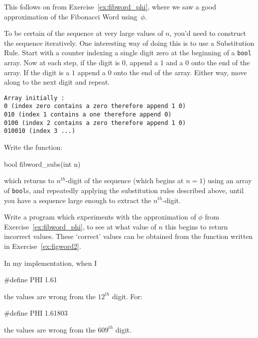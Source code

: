 \label{sec:fibword_subs}


This follows on from Exercise~\ref{ex:fibword_phi}, where we saw a
good approximation of the Fibonacci Word using~$\phi$.

To be certain of the sequence at very large values of $n$, you'd need to
construct the sequence iteratively. One interesting way of doing this
is to use a Substitution Rule. Start with a counter indexing a
single digit zero at the beginning of a \verb^bool^ array. Now at each step,
if the digit is $0$, append a $1$ and a $0$ onto the end of the array.
If the digit is a $1$ append a $0$ onto the end of the array.
Either way, move along to the next digit and repeat.
\begin{verbatim}
Array initially :
0 (index zero contains a zero therefore append 1 0)
010 (index 1 contains a one therefore append 0)
0100 (index 2 contains a zero therefore append 1 0)
010010 (index 3 ...)
\end{verbatim}


\begin{exercise}
\label{ex:fibword_subs}
Write the function:
\begin{codesnippet}
bool fibword_subs(int n)
\end{codesnippet}
which returns to $n^{th}$-digit of the sequence (which begins at $n=1$)
using an array of \verb^bool^s, and repeatedly applying the
substitution rules described above, until you have a sequence
large enough to extract the $n^{th}$-digit. 
\end{exercise}

\begin{exercise}
Write a program which experiments with the approximation of $\phi$
from Exercise~\ref{ex:fibword_phi}, to see at what value of $n$ this begins to
return incorrect values. These `correct' values can be obtained from the
function written in Exercise~\ref{ex:figword2}.

In my implementation, when I
\begin{codesnippet}
#define PHI 1.61
\end{codesnippet}
the values are wrong from the $12^{th}$ digit.
For:
\begin{codesnippet}
#define PHI 1.61803
\end{codesnippet}
the values are wrong from the $609^{th}$ digit.

\end{exercise}
